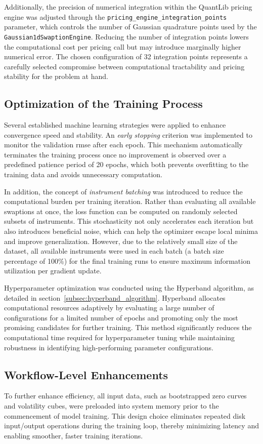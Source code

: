 Additionally, the precision of numerical integration within the QuantLib pricing engine was adjusted through the \texttt{pricing\_engine\_integration\_points} parameter, which controls the number of Gaussian quadrature points used by the \texttt{Gaussian1dSwaptionEngine}. Reducing the number of integration points lowers the computational cost per pricing call but may introduce marginally higher numerical error. The chosen configuration of 32 integration points represents a carefully selected compromise between computational tractability and pricing stability for the problem at hand.

\subsection{Optimization of the Training Process}
Several established machine learning strategies were applied to enhance convergence speed and stability. An \textit{early stopping} criterion was implemented to monitor the validation \ac{rmse} after each epoch. This mechanism automatically terminates the training process once no improvement is observed over a predefined patience period of 20 epochs, which both prevents overfitting to the training data and avoids unnecessary computation.

In addition, the concept of \textit{instrument batching} was introduced to reduce the computational burden per training iteration. Rather than evaluating all available swaptions at once, the loss function can be computed on randomly selected subsets of instruments. This stochasticity not only accelerates each iteration but also introduces beneficial noise, which can help the optimizer escape local minima and improve generalization. However, due to the relatively small size of the dataset, all available instruments were used in each batch (a batch size percentage of 100\%) for the final training runs to ensure maximum information utilization per gradient update.

Hyperparameter optimization was conducted using the Hyperband algorithm, as detailed in section~\ref{subsec:hyperband_algorithm}. Hyperband allocates computational resources adaptively by evaluating a large number of configurations for a limited number of epochs and promoting only the most promising candidates for further training. This method significantly reduces the computational time required for hyperparameter tuning while maintaining robustness in identifying high-performing parameter configurations.

\subsection{Workflow-Level Enhancements}
To further enhance efficiency, all input data, such as bootstrapped zero curves and volatility cubes, were preloaded into system memory prior to the commencement of model training. This design choice eliminates repeated disk input/output operations during the training loop, thereby minimizing latency and enabling smoother, faster training iterations.

